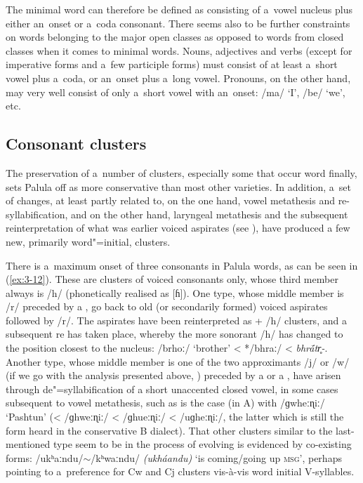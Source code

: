 The minimal word can therefore be defined as consisting of a~vowel nucleus plus either an~onset or a~coda consonant. There seems also to be further constraints on words belonging to the major open classes as opposed to words from closed classes when it comes to minimal words. Nouns, adjectives and verbs (except for imperative forms and a~few participle forms) must consist of at least a~short vowel plus a~coda, or an~onset plus a~long vowel. Pronouns, on the other hand, may very well consist of only a~short vowel with an~onset: /ma/ `I', /be/ `we', etc.


\subsection{Consonant clusters}
\label{subsec:3-3-2}


The preservation of a~number of clusters, especially some that occur word finally, sets Palula off as more conservative than most other \iliShina varieties. In addition, a~set of changes, at least partly related to, on the one hand, vowel metathesis and re-syllabification, and on the other hand, laryngeal metathesis and the subsequent reinterpretation of what was earlier voiced aspirates (see ), have produced a few new, primarily word"=initial, clusters.


There is a~maximum onset of three consonants in Palula words, as can be seen in (\ref{ex:3-12}). These are clusters of voiced consonants only, whose third member always is /h/ (phonetically realised as [ɦ]).  One type, whose middle member is /r/ preceded by a , go back to old (or secondarily formed) voiced aspirates followed by /r/. The aspirates have been reinterpreted as  + /h/ clusters, and a subsequent re has taken place, whereby the more sonorant /h/ has changed to the position closest to the  nucleus: /brhoː/ `brother' < */bhraː/ < \textit{bhr\'{\={a}}tr̥-}. Another type, whose middle member is one of the two approximants /j/ or /w/ (if we go with the analysis presented above, ) preceded by a  or a , have arisen through de"=syllabification of a short unaccented closed vowel, in some cases subsequent to vowel metathesis, such as is the case (in A) with /ɡwheːɳiː/ `Pashtun' (< /ɡhweːɳiː/ < /ɡhueːɳiː/ < /uɡheːɳiː/, the latter which is still the form heard in the conservative B dialect). That other clusters similar to the last-mentioned type seem to be in the process of evolving is evidenced by co-existing forms: /ukʰaːndu/$\sim$/kʰwaːndu/ \textit{(ukháandu)} `is coming/going up \textsc{msg}', perhaps pointing to a~preference for Cw and Cj clusters vis-à-vis word initial V-syllables. 


